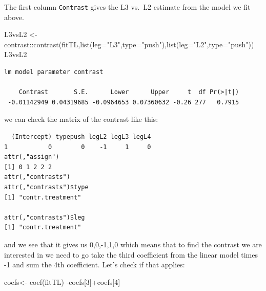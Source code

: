 \documentclass[
  letterpaper,
  DIV=11,
  numbers=noendperiod]{scrartcl}
\newenvironment{Shaded}{\begin{snugshade}}{\end{snugshade}}
\newcommand{\AttributeTok}[1]{\textcolor[rgb]{0.40,0.45,0.13}{#1}}
\newcommand{\DecValTok}[1]{\textcolor[rgb]{0.68,0.00,0.00}{#1}}
\newcommand{\FunctionTok}[1]{\textcolor[rgb]{0.28,0.35,0.67}{#1}}
\newcommand{\NormalTok}[1]{\textcolor[rgb]{0.00,0.23,0.31}{#1}}
\newcommand{\OtherTok}[1]{\textcolor[rgb]{0.00,0.23,0.31}{#1}}
\newcommand{\SpecialCharTok}[1]{\textcolor[rgb]{0.37,0.37,0.37}{#1}}
\newcommand{\StringTok}[1]{\textcolor[rgb]{0.13,0.47,0.30}{#1}}
\begin{document}
The first column \texttt{Contrast} gives the L3 vs.~L2 estimate from the
model we fit above.

\begin{Shaded}
\begin{Highlighting}[]
\NormalTok{L3vsL2 }\OtherTok{\textless{}{-}}\NormalTok{ contrast}\SpecialCharTok{::}\FunctionTok{contrast}\NormalTok{(fitTL,}\FunctionTok{list}\NormalTok{(}\AttributeTok{leg=}\StringTok{"L3"}\NormalTok{,}\AttributeTok{type=}\StringTok{"push"}\NormalTok{),}\FunctionTok{list}\NormalTok{(}\AttributeTok{leg=}\StringTok{"L2"}\NormalTok{,}\AttributeTok{type=}\StringTok{"push"}\NormalTok{))}
\NormalTok{L3vsL2}
\end{Highlighting}
\end{Shaded}

\begin{verbatim}
lm model parameter contrast

    Contrast       S.E.      Lower      Upper     t  df Pr(>|t|)
 -0.01142949 0.04319685 -0.0964653 0.07360632 -0.26 277   0.7915
\end{verbatim}

we can check the matrix of the contrast like this:

\begin{Shaded}
\end{Shaded}

\begin{verbatim}
  (Intercept) typepush legL2 legL3 legL4
1           0        0    -1     1     0
attr(,"assign")
[1] 0 1 2 2 2
attr(,"contrasts")
attr(,"contrasts")$type
[1] "contr.treatment"

attr(,"contrasts")$leg
[1] "contr.treatment"
\end{verbatim}

and we see that it gives us 0,0,-1,1,0 which means that to find the
contrast we are interested in we need to go take the third coefficient
from the linear model times -1 and sum the 4th coefficient. Let's check
if that applies:

\begin{Shaded}
\begin{Highlighting}[]
\NormalTok{coefs}\OtherTok{\textless{}{-}} \FunctionTok{coef}\NormalTok{(fitTL)}
\SpecialCharTok{{-}}\NormalTok{coefs[}\DecValTok{3}\NormalTok{]}\SpecialCharTok{+}\NormalTok{coefs[}\DecValTok{4}\NormalTok{]}
\end{Highlighting}
\end{Shaded}
\end{document}
